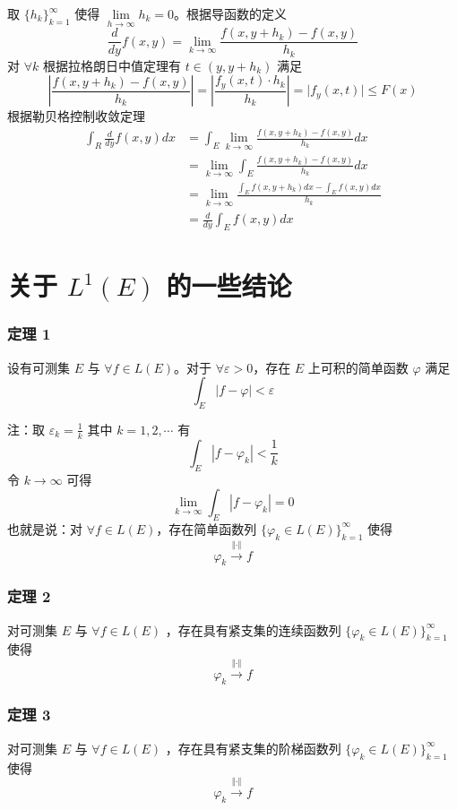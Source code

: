 \documentclass{ctexbook}
\begin{document}
取 $\{h_k\}_{k = 1}^\infty$ 使得 $\lim\limits_{h\to\infty} h_k = 0$。根据导函数的定义
\[
	\frac{d}{dy} f(x,y) = \lim_{k\to\infty} \frac{f(x,y+h_k)-f(x,y)}{h_k}
\]
对 $\forall k$ 根据拉格朗日中值定理有 $t\in(y,y+h_k)$ 满足
\[
	\left\lvert \frac{f(x,y+h_k) - f(x,y)}{h_k} \right\rvert = \left\lvert \frac{f_y(x,t)\cdot h_k}{h_k} \right\rvert = \lvert f_y(x,t) \rvert \le F(x)
\]
根据勒贝格控制收敛定理
\[
\begin{aligned}
	\int_R \frac{d}{dy} f(x,y) dx &= \int_E \lim_{k\to\infty}\frac{f(x,y+h_k) - f(x,y)}{h_k}dx\\
	&= \lim_{k\to\infty} \int_E \frac{f(x,y+h_k) - f(x,y)}{h_k}dx\\
	&= \lim_{k\to\infty}  \frac{\int_E f(x,y+h_k) dx - \int_E f(x,y) dx}{h_k}\\
	&= \frac{d}{dy} \int_E f(x,y) dx
\end{aligned}
\]
\section{关于 $L^1(E)$ 的一些结论}

\subsubsection{定理 1}

设有可测集 $E$ 与 $\forall f\in L(E)$。对于 $\forall \varepsilon > 0$，存在 $E$ 上可积的简单函数 $\varphi$ 满足
\[
	\int_E \left\lvert f-\varphi \right\rvert  < \varepsilon
\]

注：取 $\varepsilon_k =\frac1k$ 其中 $k = 1,2,\cdots$ 有
\[
	\int_E |f - \varphi_k| < \frac1k
\]
令 $k\to\infty$ 可得
\[
	\lim_{k\to\infty}\int_E |f - \varphi_k| = 0
\]
也就是说：对 $\forall f\in L(E)$，存在简单函数列 $\{\varphi_k \in L(E)\}_{k=1}^\infty$ 使得
\[
	\varphi_k \xrightarrow{\Vert\cdot\Vert} f
\]

\subsubsection{定理 2}

对可测集 $E$ 与 $\forall f\in L(E)$ ，存在具有紧支集的连续函数列 $\{\varphi_k\in L(E)\}_{k=1}^\infty$ 使得
\[
	\varphi_k \xrightarrow{\Vert\cdot\Vert} f
\]

\subsubsection{定理 3}

对可测集 $E$ 与 $\forall f\in L(E)$ ，存在具有紧支集的阶梯函数列 $\{\varphi_k\in L(E)\}_{k=1}^\infty$ 使得
\[
	\varphi_k \xrightarrow{\Vert\cdot\Vert} f
\]
\end{document}
